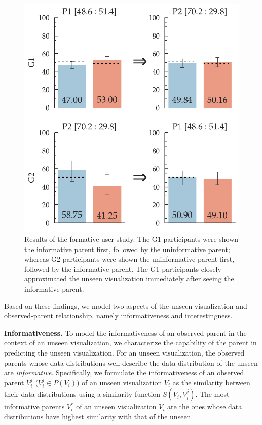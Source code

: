 \begin{figure}[bht]
\label{example}
\centering
\includegraphics[scale=0.55]{figures/Formative_Study.pdf}
\caption{Results of the formative user study. The G1 participants were shown the informative parent first, followed by the uninformative parent; whereas G2 participants were shown the uninformative parent first, followed by the informative parent. The G1 participants closely approximated the unseen visualization immediately after seeing the informative parent.}
\end{figure}

Based on these findings, we model two aspects of the unseen-visualization and observed-parent relationship, namely informativeness and interestingness. 

\textbf{Informativeness.} To model the informativeness of an observed parent in the context of an unseen visualization, we characterize the capability of the parent in predicting the unseen visualization. For an unseen visualization, the observed parents whose data distributions well describe the data distribution of the unseen are \emph{informative}. Specifically, we formulate the informativeness of an observed parent $V_i^j$ ($V_i^j \in P(V_i)$) of an unseen visualization $V_i$ as the similarity between their data distributions using a similarity function $S(V_i, V_i^j)$. The most informative parents $V_i^*$ of an unseen visualization $V_i$ are the ones whose data distributions have highest similarity with that of the unseen.

